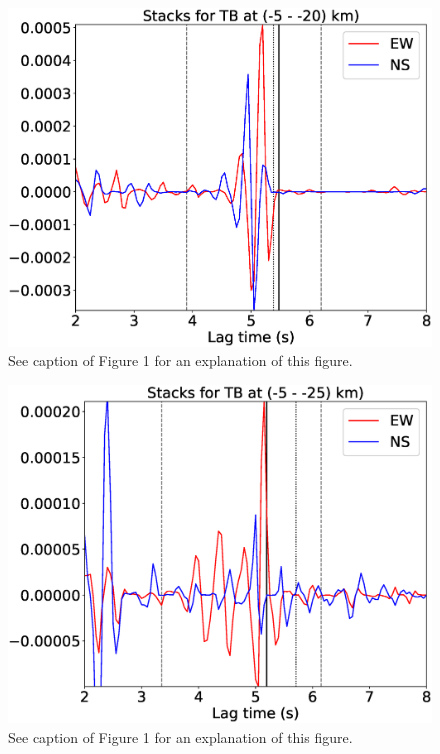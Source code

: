 \documentclass[letterpaper, 12pt]{article}
\begin{document}
\begin{figure}[H]
\includegraphics[width=\linewidth]{figures/intervals/TB_-05_-20_stacks.eps}
\caption{See caption of Figure 1 for an explanation of this figure.}
\end{figure}

\begin{figure}[H]
\includegraphics[width=\linewidth]{figures/intervals/TB_-05_-25_stacks.eps}
\caption{See caption of Figure 1 for an explanation of this figure.}
\end{figure}
\end{document}
